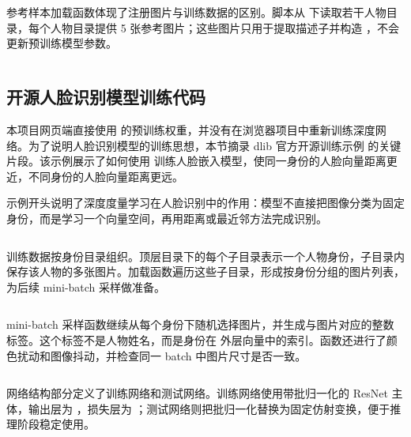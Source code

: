 \inputminted[firstline=43,lastline=59,firstnumber=43]{javascript}{code/face-recognition/dist/image_script.js}

参考样本加载函数体现了注册图片与训练数据的区别。脚本从  下读取若干人物目录，每个人物目录提供 5 张参考图片；这些图片只用于提取描述子并构造 ，不会更新预训练模型参数。

\inputminted[firstline=65,lastline=87,firstnumber=65]{javascript}{code/face-recognition/dist/image_script.js}

\subsection*{开源人脸识别模型训练代码}

本项目网页端直接使用  的预训练权重，并没有在浏览器项目中重新训练深度网络。为了说明人脸识别模型的训练思想，本节摘录 dlib 官方开源训练示例  的关键片段。该示例展示了如何使用  训练人脸嵌入模型，使同一身份的人脸向量距离更近，不同身份的人脸向量距离更远。

示例开头说明了深度度量学习在人脸识别中的作用：模型不直接把图像分类为固定身份，而是学习一个向量空间，再用距离或最近邻方法完成识别。

\inputminted[firstline=1,lastline=27,firstnumber=1]{cpp}{code/dlib/examples/dnn_metric_learning_on_images_ex.cpp}

训练数据按身份目录组织。顶层目录下的每个子目录表示一个人物身份，子目录内保存该人物的多张图片。加载函数遍历这些子目录，形成按身份分组的图片列表，为后续 mini-batch 采样做准备。

\inputminted[firstline=38,lastline=75,firstnumber=38]{cpp}{code/dlib/examples/dnn_metric_learning_on_images_ex.cpp}

mini-batch 采样函数继续从每个身份下随机选择图片，并生成与图片对应的整数标签。这个标签不是人物姓名，而是身份在  外层向量中的索引。函数还进行了颜色扰动和图像抖动，并检查同一 batch 中图片尺寸是否一致。

\inputminted[firstline=77,lastline=136,firstnumber=77]{cpp}{code/dlib/examples/dnn_metric_learning_on_images_ex.cpp}

网络结构部分定义了训练网络和测试网络。训练网络使用带批归一化的 ResNet 主体，输出层为 ，损失层为 ；测试网络则把批归一化替换为固定仿射变换，便于推理阶段稳定使用。

\inputminted[firstline=144,lastline=194,firstnumber=144]{cpp}{code/dlib/examples/dnn_metric_learning_on_images_ex.cpp}

